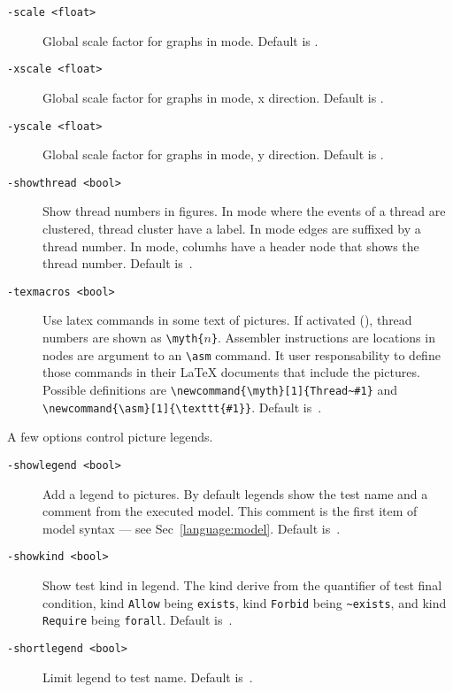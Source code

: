 \begin{description}
\item[{\tt -scale <float>}]
Global scale factor for graphs in  mode.
Default is .
\item[{\tt -xscale <float>}]
Global scale factor for graphs in  mode, x direction.
Default is .
\item[{\tt -yscale <float>}]
Global scale factor for graphs in  mode, y direction.
Default is .
\item[{\tt -showthread <bool>}] Show thread numbers in figures.
In  mode where the events of a thread are clustered,
thread cluster have a label.
In  mode  edges are suffixed by a thread number.
In  mode,  columhs have a header node that shows
the thread number. Default is~.
\item[{\tt -texmacros <bool>}] Use latex commands in some text of pictures.
If activated (), thread numbers are shown as
\verb+\myth{+$n$\verb+}+. Assembler instructions are locations in nodes
are argument to an \verb+\asm+ command. It user responsability to define
those commands in their \LaTeX{} documents that include the pictures.
Possible definitions are \verb+\newcommand{\myth}[1]{Thread~#1}+
and \verb+\newcommand{\asm}[1]{\texttt{#1}}+.
Default is~.
\end{description}

A few options control picture legends.
\begin{description}
\item[{\tt -showlegend <bool>}]
Add a legend to pictures. By default legends show the test name and
a comment from the executed model.
This comment is the first item
of model syntax  --- see Sec~\ref{language:model}.
Default is~.
\item[{\tt -showkind <bool>}]
Show test kind in legend.
The kind derive from the quantifier of test final condition,
kind \texttt{Allow} being \verb+exists+,
kind \texttt{Forbid} being \verb+~exists+,
and kind \texttt{Require} being \verb+forall+.
Default is~.
\item[{\tt -shortlegend <bool>}]
Limit legend to test name. Default is~.
\end{description}

